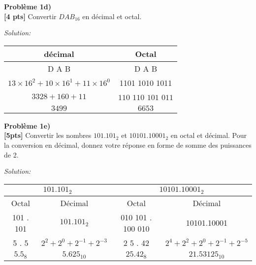\documentclass{article}
\newenvironment{problem}[2][Problème]
    { \begin{mdframed}[backgroundcolor=gray!20] \textbf{#1 #2} \\}
    {  \end{mdframed}}
\newenvironment{solution}
    {\textit{Solution:}}
    {}
\begin{document}
\newpage
\begin{problem}{1d)}
\textbf{[4 pts]} Convertir $DAB_{16}$ en décimal et octal.
\end{problem}
\begin{solution}
    \begin{tabular}{c|c}
        décimal & Octal\\
        \hline
        D \hspace{40pt}A\hspace{40pt} B & D\hspace{15pt} A\hspace{15pt} B\\
        $13\times16^2 + 10\times16^1 + 11\times16^0$ & 1101 1010 1011\\
        $3328+160+11$ & $110$ $110$ $101$ $011$\\
        $3499$ & $6653$
        
    \end{tabular}
\end{solution}

\begin{problem}{1e)}
\textbf{[5pts]} Convertir les nombres $101.101_2$ et $10101.10001_2$ en octal et décimal. Pour la conversion en décimal, donnez votre réponse en forme de somme des puissances de 2.
\end{problem}
\begin{solution}
    \begin{tabular}{|c|c|c|c|}
        \hline
        \multicolumn{2}{|c|}{\large $101.101_2$} & \multicolumn{2}{|c|}{\large $10101.10001_2$}\\
        \hline
        Octal & Décimal & Octal & Décimal\\
        \hline
        101 . 101 & $101.101_2$ & 010 101 . 100 010 & 10101.10001 \\
        5  .  5 & $2^2+2^0+2^{-1}+2^{-3}$ & 2 \hspace{12pt}5 . 4\hspace{12pt}2 & $2^4+2^2+2^0+2^{-1}+2^{-5}$  \\
        $5.5_8$&$5.625_{10}$&$25.42_8$&$21.53125_{10}$\\
        \hline
    \end{tabular}
\end{solution}
\end{document}
